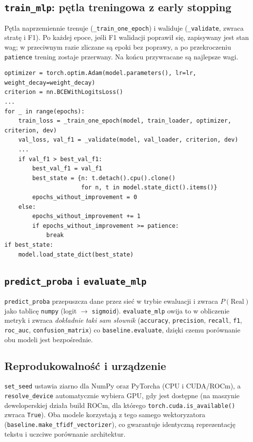 \subsection{\texttt{train\_mlp}: pętla treningowa z early stopping}

Pętla naprzemiennie trenuje (\texttt{\_train\_one\_epoch}) i waliduje
(\texttt{\_validate}, zwraca stratę i F1). Po każdej epoce, jeśli F1 walidacji
poprawił się, zapisywany jest stan wag; w przeciwnym razie zliczane są epoki bez
poprawy, a po przekroczeniu \texttt{patience} trening zostaje przerwany. Na końcu
przywracane są najlepsze wagi.

\begin{lstlisting}[caption={Rdzeń early stopping w \texttt{train\_mlp}.}]
optimizer = torch.optim.Adam(model.parameters(), lr=lr, weight_decay=weight_decay)
criterion = nn.BCEWithLogitsLoss()
...
for _ in range(epochs):
    train_loss = _train_one_epoch(model, train_loader, optimizer, criterion, dev)
    val_loss, val_f1 = _validate(model, val_loader, criterion, dev)
    ...
    if val_f1 > best_val_f1:
        best_val_f1 = val_f1
        best_state = {n: t.detach().cpu().clone()
                      for n, t in model.state_dict().items()}
        epochs_without_improvement = 0
    else:
        epochs_without_improvement += 1
        if epochs_without_improvement >= patience:
            break
if best_state:
    model.load_state_dict(best_state)
\end{lstlisting}

\subsection{\texttt{predict\_proba} i \texttt{evaluate\_mlp}}

\texttt{predict\_proba} przepuszcza dane przez sieć w trybie ewaluacji i zwraca
$P(\text{Real})$ jako tablicę \texttt{numpy} (logit $\to$ \texttt{sigmoid}).
\texttt{evaluate\_mlp} owija to w obliczenie metryk i zwraca \emph{dokładnie taki
sam słownik} (\texttt{accuracy}, \texttt{precision}, \texttt{recall}, \texttt{f1},
\texttt{roc\_auc}, \texttt{confusion\_matrix}) co \texttt{baseline.evaluate}, dzięki
czemu porównanie obu modeli jest bezpośrednie.

\subsection{Reprodukowalność i urządzenie}

\texttt{set\_seed} ustawia ziarno dla NumPy oraz PyTorcha (CPU i CUDA/ROCm), a
\texttt{resolve\_device} automatycznie wybiera GPU, gdy jest dostępne (na maszynie
deweloperskiej działa build ROCm, dla którego \texttt{torch.cuda.is\_available()}
zwraca \texttt{True}). Oba modele korzystają z tego samego wektoryzatora
(\texttt{baseline.make\_tfidf\_vectorizer}), co gwarantuje identyczną reprezentację
tekstu i uczciwe porównanie architektur.
